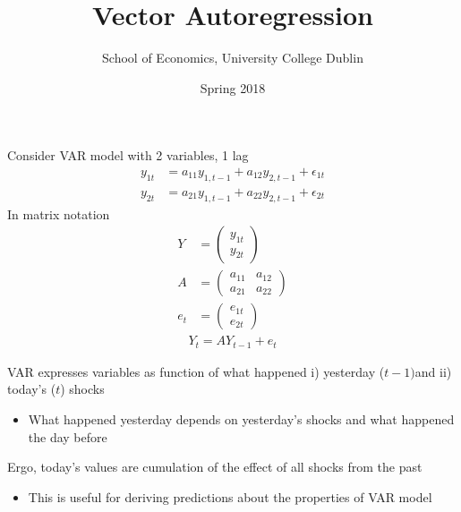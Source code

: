 \documentclass{beamer}
\title{Vector Autoregression}
\author{School of Economics, University College Dublin}
\date{Spring 2018}
\begin{document}
\begin{frame}
 \titlepage
\end{frame}

\begin{frame}
  Consider VAR model with 2 variables, 1 lag  
\begin{align}
  y_{1t} &= a_{11} y_{1, t-1} + a_{12} y_{2,t-1} + \epsilon_{1t}\\ \nonumber
  y_{2t} &= a_{21} y_{1, t-1} + a_{22} y_{2,t-1} + \epsilon_{2t}
\end{align} 
\medskip
In matrix notation
\begin{align}
   Y&=   \begin{pmatrix}   y_{1t}\\  y_{2t}   \end{pmatrix}  \\   \nonumber
   A&=   \begin{pmatrix}   a_{11} & a_{12}\\   a_{21} &a_{22}   \end{pmatrix}  \\ \nonumber
   e_t&=   \begin{pmatrix}     e_{1t} \\ e_{2t}   \end{pmatrix}   
\end{align}
\begin{align}  Y_t = AY_{t-1} + e_{t} \end{align}
\end{frame}

\begin{frame}
  VAR expresses variables as function of what happened i) yesterday ($t-1) $and ii) today's ($t$) shocks
  \begin{itemize}
    \item What happened yesterday depends on yesterday's shocks and what happened the day before
  \end{itemize}
  \medskip
  Ergo, today's values are cumulation of the effect of all shocks from the past
  \begin{itemize}
    \item This is useful for deriving predictions about the properties of VAR model
  \end{itemize}
\end{frame}
\end{document}

